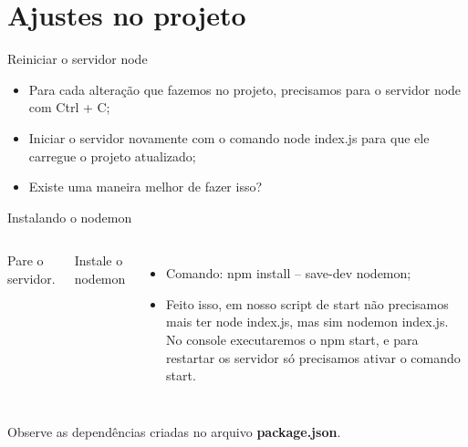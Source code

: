 \documentclass{beamer}
\begin{document}
\section{Ajustes no projeto}
    \begin{frame}[label=proof]{Reiniciar o servidor node}
	\begin{itemize}
	\item Para cada alteração que fazemos no projeto, precisamos para o servidor node com \alert{Ctrl + C};
	\item Iniciar o servidor novamente com o comando \alert{node index.js} para que ele carregue o projeto atualizado;
	\item Existe uma maneira melhor de fazer isso?
	\end{itemize}
    \end{frame}
    \begin{frame}{Instalando o nodemon}
      \begin{columns}[onlytextwidth]
         Pare o servidor.
        
          \vspace{0.5cm}
	Instale o nodemon
            \pause
            \begin{itemize}
		\item Comando: \alert{npm install -- save-dev nodemon};
		\item Feito isso, em nosso script de start não precisamos mais ter node index.js, mas sim nodemon index.js. No console executaremos o npm start, e para restartar os servidor só precisamos ativar o comando start.
	\end{itemize}
      \end{columns}
      Observe as dependências criadas no arquivo \textbf{package.json}.
    \end{frame}
   
%
%
  
\end{document}
